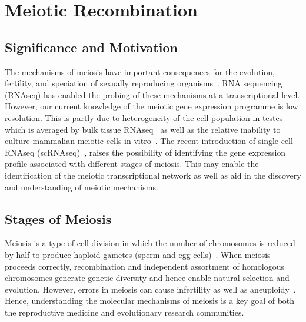 \section{Meiotic Recombination}

\subsection{Significance and Motivation}
The mechanisms of meiosis have important consequences for the evolution, fertility, and speciation of sexually reproducing organisms~\cite{Davies2016Reengineering,Hassold2007Origin}. RNA sequencing (RNAseq) has enabled the probing of these mechanisms at a transcriptional level. However, our current knowledge of the meiotic gene expression programme is low resolution. This is partly due to heterogeneity of the cell population in testes which is averaged by bulk tissue RNAseq~\cite{YasuhiroFUJIWAR2014Differential} as well as the relative inability to culture mammalian meiotic cells in vitro~\cite{Zhou2016Complete}. The recent introduction of single cell RNAseq (scRNAseq)~\cite{Gawad2016Singlecell}, raises the possibility of identifying the gene expression profile associated with different stages of meiosis. This may enable the identification of the meiotic transcriptional network as well as aid in the discovery and understanding of meiotic mechanisms.


\subsection{Stages of Meiosis}
Meiosis is a type of cell division in which the number of chromosomes is reduced by half to produce haploid gametes (sperm and egg cells)~\cite{Ohkura2015Meiosis}. When meiosis proceeds correctly, recombination and independent assortment of homologous chromosomes generate genetic diversity and hence enable natural selection and evolution. However, errors in meiosis can cause infertility as well as aneuploidy~\cite{Handel2010Genetics,Hassold2007Origin}. Hence, understanding the molecular mechanisms of meiosis is a key goal of both the reproductive medicine and evolutionary research communities.

